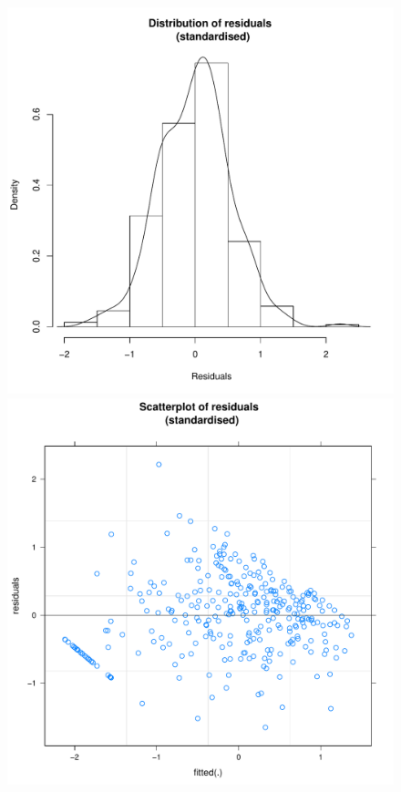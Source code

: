 \begin{CJK}{UTF8}{gbsn}
       \begin{figure}[!htbp]
         \includegraphics[scale =.4]{images/MLM31aHist.pdf}
         \includegraphics[scale =.4]{images/MLM31aScatter.pdf}

\end{figure}
\end{CJK}
